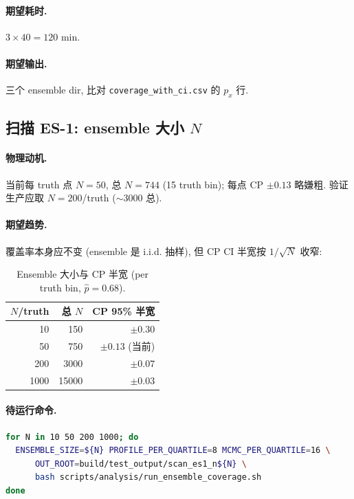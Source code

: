 \paragraph{期望耗时.} $3 \times 40 = 120$ min.
\paragraph{期望输出.} 三个 ensemble dir, 比对 \texttt{coverage\_with\_ci.csv} 的 $p_x$ 行.

\subsection{扫描 ES-1: ensemble 大小 $N$}
\label{sec:partIII:scans:es1}

\paragraph{物理动机.}
当前每 truth 点 $N = 50$, 总 $N = 744$ (15 truth bin); 每点 CP $\pm 0.13$ 略嫌粗. 验证生产应取 $N = 200$/truth ($\sim 3000$ 总).

\paragraph{期望趋势.}
覆盖率本身应不变 (ensemble 是 i.i.d. 抽样), 但 CP CI 半宽按 $1 / \sqrt{N}$ 收窄:

\begin{table}[H]
\centering\small
\caption{Ensemble 大小与 CP 半宽 (per truth bin, $\hat p = 0.68$).}
\label{tab:partIII:es1_extrapolate}
\begin{tabular}{rrr}
\toprule
$N$/truth & 总 $N$ & CP 95\% 半宽 \\
\midrule
10  & 150  & $\pm 0.30$ \\
50  & 750  & $\pm 0.13$ (当前) \\
200 & 3000 & $\pm 0.07$ \\
1000 & 15000 & $\pm 0.03$ \\
\bottomrule
\end{tabular}
\end{table}

\paragraph{待运行命令.}
\begin{lstlisting}[language=bash,caption={ensemble size scan ES-1},label=lst:partIII:es1_cmd]
for N in 10 50 200 1000; do
  ENSEMBLE_SIZE=${N} PROFILE_PER_QUARTILE=8 MCMC_PER_QUARTILE=16 \
      OUT_ROOT=build/test_output/scan_es1_n${N} \
      bash scripts/analysis/run_ensemble_coverage.sh
done
\end{lstlisting}


